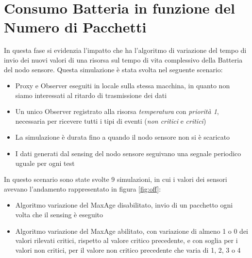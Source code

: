   \section{Consumo Batteria in funzione del Numero di Pacchetti}
    In questa fase si evidenzia l'impatto che ha l'algoritmo di variazione del tempo di invio dei nuovi valori di una risorsa sul tempo di vita complessivo della Batteria del nodo sensore.\newline
    Questa simulazione è stata svolta nel seguente scenario:
    \begin{itemize}
      \item Proxy e Observer eseguiti in locale sulla stessa macchina, in quanto non siamo interessati al ritardo di trasmissione dei dati
      \item Un unico Observer registrato alla risorsa \textit{temperatura} con \textit{priorità 1}, necessaria per ricevere tutti i tipi di eventi (\textit{non critici} e \textit{critici})
      \item La simulazione è durata fino a quando il nodo sensore non si è scaricato
      \item I dati generati dal sensing del nodo sensore seguivano una segnale periodico uguale per ogni test
    \end{itemize}
    In questo scenario sono state svolte 9 simulazioni, in cui i valori dei sensori avevano l'andamento rappresentato in figura \ref{fig:off}:
    \begin{itemize}
      \item Algoritmo variazione del MaxAge disabilitato, invio di un pacchetto ogni volta che il sensing è eseguito
      \item Algoritmo variazione del MaxAge abilitato, con variazione di almeno 1 o 0 dei valori rilevati critici, rispetto al valore critico precedente, e con soglia per i valori non critici, per il valore non critico precedente che varia di 1, 2, 3 o 4
    \end{itemize}
